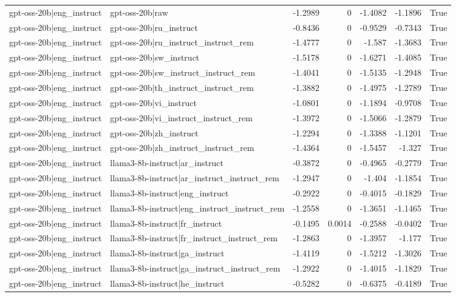 \begin{table}
\begin{tabular}{l l r r r r l}
gpt-oss-20b|eng_instruct & gpt-oss-20b|raw & -1.2989 & 0 & -1.4082 & -1.1896 & True \\
gpt-oss-20b|eng_instruct & gpt-oss-20b|ru_instruct & -0.8436 & 0 & -0.9529 & -0.7343 & True \\
gpt-oss-20b|eng_instruct & gpt-oss-20b|ru_instruct_instruct_rem & -1.4777 & 0 & -1.587 & -1.3683 & True \\
gpt-oss-20b|eng_instruct & gpt-oss-20b|sw_instruct & -1.5178 & 0 & -1.6271 & -1.4085 & True \\
gpt-oss-20b|eng_instruct & gpt-oss-20b|sw_instruct_instruct_rem & -1.4041 & 0 & -1.5135 & -1.2948 & True \\
gpt-oss-20b|eng_instruct & gpt-oss-20b|th_instruct_instruct_rem & -1.3882 & 0 & -1.4975 & -1.2789 & True \\
gpt-oss-20b|eng_instruct & gpt-oss-20b|vi_instruct & -1.0801 & 0 & -1.1894 & -0.9708 & True \\
gpt-oss-20b|eng_instruct & gpt-oss-20b|vi_instruct_instruct_rem & -1.3972 & 0 & -1.5066 & -1.2879 & True \\
gpt-oss-20b|eng_instruct & gpt-oss-20b|zh_instruct & -1.2294 & 0 & -1.3388 & -1.1201 & True \\
gpt-oss-20b|eng_instruct & gpt-oss-20b|zh_instruct_instruct_rem & -1.4364 & 0 & -1.5457 & -1.327 & True \\
gpt-oss-20b|eng_instruct & llama3-8b-instruct|ar_instruct & -0.3872 & 0 & -0.4965 & -0.2779 & True \\
gpt-oss-20b|eng_instruct & llama3-8b-instruct|ar_instruct_instruct_rem & -1.2947 & 0 & -1.404 & -1.1854 & True \\
gpt-oss-20b|eng_instruct & llama3-8b-instruct|eng_instruct & -0.2922 & 0 & -0.4015 & -0.1829 & True \\
gpt-oss-20b|eng_instruct & llama3-8b-instruct|eng_instruct_instruct_rem & -1.2558 & 0 & -1.3651 & -1.1465 & True \\
gpt-oss-20b|eng_instruct & llama3-8b-instruct|fr_instruct & -0.1495 & 0.0014 & -0.2588 & -0.0402 & True \\
gpt-oss-20b|eng_instruct & llama3-8b-instruct|fr_instruct_instruct_rem & -1.2863 & 0 & -1.3957 & -1.177 & True \\
gpt-oss-20b|eng_instruct & llama3-8b-instruct|ga_instruct & -1.4119 & 0 & -1.5212 & -1.3026 & True \\
gpt-oss-20b|eng_instruct & llama3-8b-instruct|ga_instruct_instruct_rem & -1.2922 & 0 & -1.4015 & -1.1829 & True \\
gpt-oss-20b|eng_instruct & llama3-8b-instruct|he_instruct & -0.5282 & 0 & -0.6375 & -0.4189 & True \\

\end{tabular}
\end{table}
